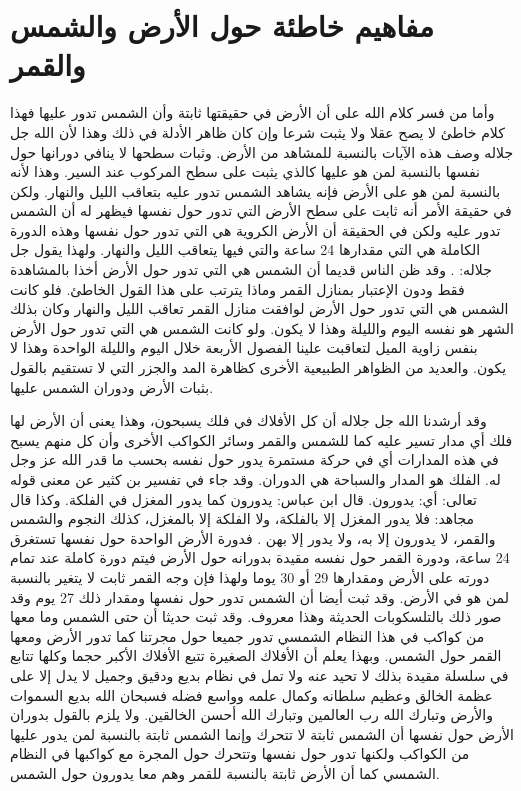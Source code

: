 \section{مفاهيم خاطئة حول الأرض والشمس والقمر}

وأما من فسر كلام الله على أن الأرض في حقيقتها ثابتة وأن الشمس تدور عليها فهذا كلام خاطئ لا يصح عقلا ولا يثبت شرعا وإن كان ظاهر الأدلة في ذلك وهذا لأن الله جل جلاله وصف هذه الآيات بالنسبة للمشاهد من الأرض. وثبات سطحها لا ينافي دورانها حول نفسها بالنسبة لمن هو عليها كالذي يثبت على سطح المركوب عند السير. وهذا لأنه بالنسبة لمن هو على الأرض فإنه يشاهد الشمس تدور عليه بتعاقب الليل والنهار. ولكن في حقيقة الأمر أنه ثابت على سطح الأرض التي تدور حول نفسها فيظهر له أن الشمس تدور عليه ولكن في الحقيقة أن الأرض الكروية هي التي تدور حول نفسها وهذه الدورة الكاملة هي التي مقدارها 24 ساعة والتي فيها يتعاقب الليل والنهار. ولهذا يقول جل جلاله: \quranayah*[39][5] {\footnotesize (\surahname*[39])}. وقد ظن الناس قديما أن الشمس هي التي تدور حول الأرض أخذا بالمشاهدة فقط ودون الإعتبار بمنازل القمر وماذا يترتب على هذا القول الخاطئ. فلو كانت الشمس هي التي تدور حول الأرض لوافقت منازل القمر تعاقب الليل والنهار وكان بذلك الشهر هو نفسه اليوم والليلة وهذا لا يكون. ولو كانت الشمس هي التي تدور حول الأرض بنفس زاوية الميل لتعاقبت علينا الفصول الأربعة خلال اليوم والليلة الواحدة وهذا لا يكون. والعديد من الظواهر الطبيعية الأخرى كظاهرة المد والجزر التي لا تستقيم بالقول بثبات الأرض ودوران الشمس عليها. 

وقد أرشدنا الله جل جلاله أن كل الأفلاك في فلك يسبحون، وهذا يعنى أن الأرض لها فلك أي مدار تسير عليه كما للشمس والقمر وسائر الكواكب الأخرى وأن كل منهم يسبح في هذه المدارات أي في حركة مستمرة يدور حول نفسه بحسب ما قدر الله عز وجل له. الفلك هو المدار والسباحة هي الدوران. وقد جاء في تفسير بن كثير عن معنى قوله تعالى: \quranayah*[36][40][12] {\footnotesize (\surahname*[36])} أي: يدورون. قال ابن عباس: يدورون كما يدور المغزل في الفلكة. وكذا قال مجاهد: فلا يدور المغزل إلا بالفلكة، ولا الفلكة إلا بالمغزل، كذلك النجوم والشمس والقمر، لا يدورون إلا به، ولا يدور إلا بهن \href{https://shamela.ws/book/8473/2750#p4}{\faExternalLink} \cite{tafsir_ibnKathir}. فدورة الأرض الواحدة حول نفسها تستغرق 24 ساعة، ودورة القمر حول نفسه مقيدة بدورانه حول الأرض فيتم دورة كاملة عند تمام دورته على الأرض ومقدارها 29 أو 30 يوما ولهذا فإن وجه القمر ثابت لا يتغير بالنسبة لمن هو في الأرض. وقد ثبت أيضا أن الشمس تدور حول نفسها ومقدار ذلك 27 يوم وقد صور ذلك بالتلسكوبات الحديثة وهذا معروف. وقد ثبت حديثا أن حتى الشمس وما معها من كواكب في هذا النظام الشمسي تدور جميعا حول مجرتنا كما تدور الأرض ومعها القمر حول الشمس. وبهذا يعلم أن الأفلاك الصغيرة تتبع الأفلاك الأكبر حجما وكلها تتابع في سلسلة مقيدة بذلك لا تحيد عنه ولا تمل في نظام بديع ودقيق وجميل لا يدل إلا على عظمة الخالق وعظيم سلطانه وكمال علمه وواسع فضله فسبحان الله بديع السموات والأرض وتبارك الله رب العالمين وتبارك الله أحسن الخالقين. ولا يلزم بالقول بدوران الأرض حول نفسها أن الشمس ثابتة لا تتحرك وإنما الشمس ثابتة بالنسبة لمن يدور عليها من الكواكب ولكنها تدور حول نفسها وتتحرك حول المجرة مع كواكبها في النظام الشمسي كما أن الأرض ثابتة بالنسبة للقمر وهم معا يدورون حول الشمس.

